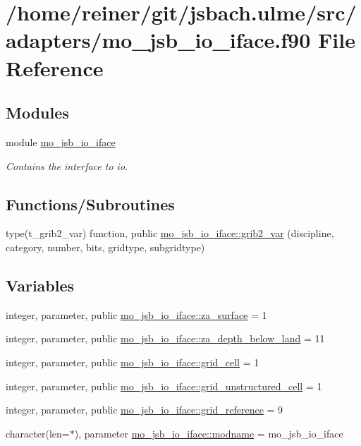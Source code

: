 \hypertarget{mo__jsb__io__iface_8f90}{}\section{/home/reiner/git/jsbach.ulme/src/adapters/mo\+\_\+jsb\+\_\+io\+\_\+iface.f90 File Reference}
\label{mo__jsb__io__iface_8f90}
\subsection*{Modules}
\begin{DoxyCompactItemize}
\item 
module \hyperlink{namespacemo__jsb__io__iface}{mo\+\_\+jsb\+\_\+io\+\_\+iface}
\begin{DoxyCompactList}\small\item\em Contains the interface to io. \end{DoxyCompactList}\end{DoxyCompactItemize}
\subsection*{Functions/\+Subroutines}
\begin{DoxyCompactItemize}
\item 
type(t\+\_\+grib2\+\_\+var) function, public \hyperlink{namespacemo__jsb__io__iface_a7dcb7e7f110b47d470552f4961b9f07d}{mo\+\_\+jsb\+\_\+io\+\_\+iface\+::grib2\+\_\+var} (discipline, category, number, bits, gridtype, subgridtype)
\end{DoxyCompactItemize}
\subsection*{Variables}
\begin{DoxyCompactItemize}
\item 
integer, parameter, public \hyperlink{namespacemo__jsb__io__iface_ab7d5e02770372d76b4e849aad1df02c6}{mo\+\_\+jsb\+\_\+io\+\_\+iface\+::za\+\_\+surface} = 1
\item 
integer, parameter, public \hyperlink{namespacemo__jsb__io__iface_a79c0041a5e9568c7cb97d79f478ce461}{mo\+\_\+jsb\+\_\+io\+\_\+iface\+::za\+\_\+depth\+\_\+below\+\_\+land} = 11
\item 
integer, parameter, public \hyperlink{namespacemo__jsb__io__iface_a30ebf996cc621d7f8ecfa372b0e452c2}{mo\+\_\+jsb\+\_\+io\+\_\+iface\+::grid\+\_\+cell} = 1
\item 
integer, parameter, public \hyperlink{namespacemo__jsb__io__iface_a4923bf314c5fffee744c897b5d7b82ae}{mo\+\_\+jsb\+\_\+io\+\_\+iface\+::grid\+\_\+unstructured\+\_\+cell} = 1
\item 
integer, parameter, public \hyperlink{namespacemo__jsb__io__iface_aadac9f6eb4b6f2ac600ea3c0eabe6a93}{mo\+\_\+jsb\+\_\+io\+\_\+iface\+::grid\+\_\+reference} = 9
\item 
character(len=$\ast$), parameter \hyperlink{namespacemo__jsb__io__iface_aba3d7fda335dca67008e7972403aebf6}{mo\+\_\+jsb\+\_\+io\+\_\+iface\+::modname} = \textquotesingle{}mo\+\_\+jsb\+\_\+io\+\_\+iface\textquotesingle{}
\end{DoxyCompactItemize}
